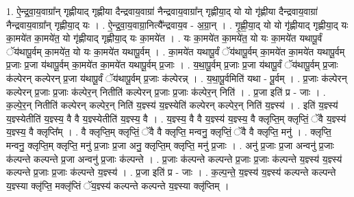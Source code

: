 \documentclass[17pt]{extarticle}
\begin{document}
1. ऐ॒न्द्र॒वा॒य॒वाग्रा᳚न् गृह्णीयाद् गृह्णीया दैन्द्रवाय॒वाग्रा॑ नैन्द्रवाय॒वाग्रा᳚न् गृह्णीया॒द् यो यो गृ॑ह्णीया दैन्द्रवाय॒वाग्रा॑ नैन्द्रवाय॒वाग्रा᳚न् गृह्णीया॒द् यः । . ऐ॒न्द्र॒वा॒य॒वाग्रा॒नित्यै᳚न्द्रवाय॒व - अ॒ग्रा॒न् । . गृ॒ह्णी॒या॒द् यो यो गृ॑ह्णीयाद् गृह्णीया॒द् यः का॒मये॑त का॒मये॑त॒ यो गृ॑ह्णीयाद् गृह्णीया॒द् यः का॒मये॑त । . यः का॒मये॑त का॒मये॑त॒ यो यः का॒मये॑त यथापू॒र्वं ॅय॑थापू॒र्वम् का॒मये॑त॒ यो यः का॒मये॑त यथापू॒र्वम् । . का॒मये॑त यथापू॒र्वं ॅय॑थापू॒र्वम् का॒मये॑त का॒मये॑त यथापू॒र्वम् प्र॒जाः प्र॒जा य॑थापू॒र्वम् का॒मये॑त का॒मये॑त यथापू॒र्वम् प्र॒जाः । . य॒था॒पू॒र्वम् प्र॒जाः प्र॒जा य॑थापू॒र्वं ॅय॑थापू॒र्वम् प्र॒जाः क॑ल्पेरन् कल्पेरन् प्र॒जा य॑थापू॒र्वं ॅय॑थापू॒र्वम् प्र॒जाः क॑ल्पेरन्न् । . य॒था॒पू॒र्वमिति॑ यथा - पू॒र्वम् । . प्र॒जाः क॑ल्पेरन् कल्पेरन् प्र॒जाः प्र॒जाः क॑ल्पेर॒न् नितीति॑ कल्पेरन् प्र॒जाः प्र॒जाः क॑ल्पेर॒न् निति॑ । . प्र॒जा इति॑ प्र - जाः । . क॒ल्पे॒र॒न् नितीति॑ कल्पेरन् कल्पेर॒न् निति॑ य॒ज्ञ्स्य॑ य॒ज्ञ्स्येति॑ कल्पेरन् कल्पेर॒न् निति॑ य॒ज्ञ्स्य॑ । . इति॑ य॒ज्ञ्स्य॑ य॒ज्ञ्स्येतीति॑ य॒ज्ञ्स्य॒ वै वै य॒ज्ञ्स्येतीति॑ य॒ज्ञ्स्य॒ वै । . य॒ज्ञ्स्य॒ वै वै य॒ज्ञ्स्य॑ य॒ज्ञ्स्य॒ वै क्लृप्ति॒म् क्लृप्तिं॒ ॅवै य॒ज्ञ्स्य॑ य॒ज्ञ्स्य॒ वै क्लृप्ति᳚म् । . वै क्लृप्ति॒म् क्लृप्तिं॒ ॅवै वै क्लृप्ति॒ मन्वनु॒ क्लृप्तिं॒ ॅवै वै क्लृप्ति॒ मनु॑ । . क्लृप्ति॒ मन्वनु॒ क्लृप्ति॒म् क्लृप्ति॒ मनु॑ प्र॒जाः प्र॒जा अनु॒ क्लृप्ति॒म् क्लृप्ति॒ मनु॑ प्र॒जाः । . अनु॑ प्र॒जाः प्र॒जा अन्वनु॑ प्र॒जाः क॑ल्पन्ते कल्पन्ते प्र॒जा अन्वनु॑ प्र॒जाः क॑ल्पन्ते । . प्र॒जाः क॑ल्पन्ते कल्पन्ते प्र॒जाः प्र॒जाः क॑ल्पन्ते य॒ज्ञ्स्य॑ य॒ज्ञ्स्य॑ कल्पन्ते प्र॒जाः प्र॒जाः क॑ल्पन्ते य॒ज्ञ्स्य॑ । . प्र॒जा इति॑ प्र - जाः । . क॒ल्प॒न्ते॒ य॒ज्ञ्स्य॑ य॒ज्ञ्स्य॑ कल्पन्ते कल्पन्ते य॒ज्ञ्स्या क्लृ॑प्ति॒ मक्लृ॑प्तिं ॅय॒ज्ञ्स्य॑ कल्पन्ते कल्पन्ते य॒ज्ञ्स्या क्लृ॑प्तिम् । \newline
\end{document}
